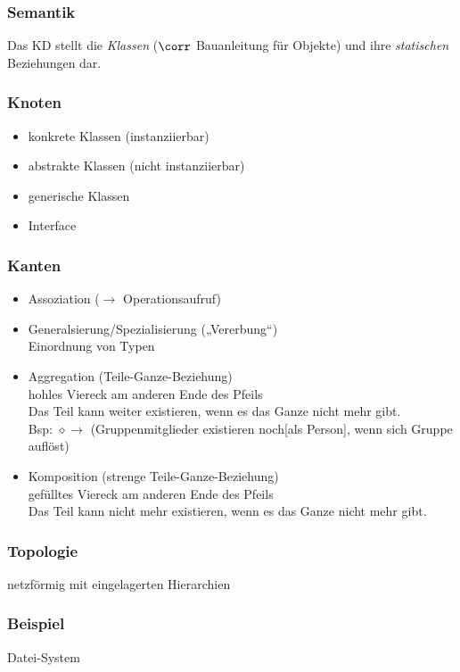 \documentclass{scrreprt}
\begin{document}
\subsubsection{Semantik} Das KD stellt die \emph{Klassen} ($\corr$ Bauanleitung für Objekte) und ihre \emph{statischen} Beziehungen dar. 
\subsubsection{Knoten}
\begin{itemize}
	\item konkrete Klassen (instanziierbar)
	\item abstrakte Klassen (nicht instanziierbar)
	\item generische Klassen
	\item Interface
\end{itemize}
\subsubsection{Kanten}
\begin{itemize}
	\item Assoziation ($\to$ Operationsaufruf)
	\item Generalsierung/Spezialisierung („Vererbung“)\\
	Einordnung von Typen
	\item Aggregation (Teile-Ganze-Beziehung)\\
	hohles Viereck am anderen Ende des Pfeils\\
	Das Teil kann weiter existieren, wenn es das Ganze nicht mehr gibt.\\
	Bsp:  $\diamond\!\! \to$  (Gruppenmitglieder existieren noch[als Person], wenn sich Gruppe auflöst)
	\item Komposition (strenge Teile-Ganze-Beziehung)\\
	gefülltes Viereck am anderen Ende des Pfeils\\
	Das Teil kann nicht mehr existieren, wenn es das Ganze nicht mehr gibt.
\end{itemize}

\subsubsection{Topologie}
netzförmig mit eingelagerten Hierarchien

\subsubsection{Beispiel}
Datei-System
\end{document}
